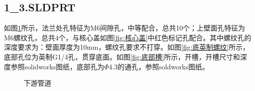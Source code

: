 \documentclass{MyLatex}
\begin{document}
\subsection{1\_3.SLDPRT}
如图\ref{fig:出水管}所示，法兰处孔特征为M6间隙孔，中等配合，总共10个；上壁面孔特征为M6螺纹孔，总共4个，与核心盖如图\ref{fig:核心盖}中红色标记孔配合。其中螺纹孔的深度要求为：壁面厚度为10mm，螺纹孔要求不打穿。如图\ref{fig:底英制螺纹}所示，底部孔位为英制G1/4孔，贯穿底面。如图\ref{fig:底部槽}所示，开槽，开槽尺寸和深度参照solidworks图纸，底部孔为$\Phi$4.3的通孔，参照soldworks图纸。
\begin{figure}[H]
\centering
{}
\quad
{}
\caption{下游管道} \label{fig:出水管}
\end{figure}
\end{document}
